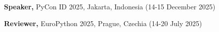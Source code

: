 
\begin{cvlistsection}
\item \textbf{Speaker,} PyCon ID 2025, Jakarta, Indonesia (14-15 December 2025)
\item \textbf{Reviewer,} EuroPython 2025, Prague, Czechia (14-20 July 2025)
\end{cvlistsection}
